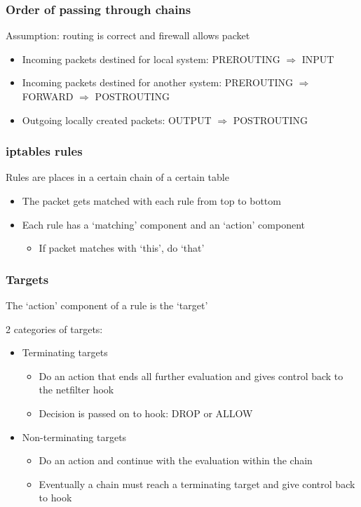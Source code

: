 \documentclass{article}
\begin{document}
\subsubsection{Order of passing through chains}

Assumption: routing is correct and firewall allows packet

\begin{itemize}
    \item Incoming packets destined for local system: PREROUTING $\Rightarrow$ INPUT
    \item Incoming packets destined for another system: PREROUTING $\Rightarrow$ FORWARD $\Rightarrow$ POSTROUTING
    \item Outgoing locally created packets: OUTPUT $\Rightarrow$ POSTROUTING
\end{itemize}

\subsubsection{iptables rules}

Rules are places in a certain chain of a certain table

\begin{itemize}
    \item The packet gets matched with each rule from top to bottom
    \item Each rule has a `matching' component and an `action' component
    \begin{itemize}
        \item If packet matches with `this', do `that'
    \end{itemize}
\end{itemize}

\subsubsection{Targets}

The `action' component of a rule is the `target'

2 categories of targets:

\begin{itemize}
    \item Terminating targets
    \begin{itemize}
        \item Do an action that ends all further evaluation and gives control back to the netfilter hook
        \item Decision is passed on to hook: DROP or ALLOW
    \end{itemize}
    \item Non-terminating targets
    \begin{itemize}
        \item Do an action and continue with the evaluation within the chain
        \item Eventually a chain must reach a terminating target and give control back to hook
    \end{itemize}
\end{itemize}
\end{document}
